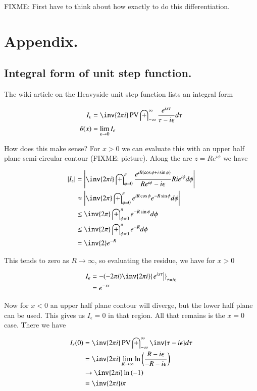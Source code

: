 \documentclass{article}
\DeclareMathOperator{\PV}{PV}
\newcommand{\IIinf}[0]{ \int_{-\infty}^\infty }
\begin{document}
FIXME: First have to think about how exactly to do this differentiation.

\section{ Appendix. }
\subsection{ Integral form of unit step function. }

The wiki article on the Heavyside unit step function lists an integral form

\begin{align}
I_\epsilon &= \inv{2\pi i} \PV \IIinf \frac{e^{ix\tau}}{\tau - i\epsilon} d\tau \\
\theta(x) &= \lim_{\epsilon \rightarrow 0} I_\epsilon
\end{align}

How does this make sense?  For $x>0$ we can evaluate this with an upper half plane semi-circular contour (FIXME: picture).  Along the arc $z = R e^{i\phi}$ we have

\begin{align*}
\Abs{I_\epsilon}
&= \Abs{\inv{2\pi i} \int_{\phi=0}^{\pi} \frac{e^{i R (\cos\phi + i \sin\phi)}}{ R e^{i\phi} - i \epsilon} R i e^{i\phi} d\phi} \\
&\approx \Abs{\inv{2\pi} \int_{\phi=0}^{\pi} e^{i R \cos\phi } e^{- R \sin\phi } d\phi} \\
&\le \inv{2\pi} \int_{\phi=0}^{\pi} e^{- R \sin\phi } d\phi \\
&\le \inv{2\pi} \int_{\phi=0}^{\pi} e^{- R } d\phi \\
&= \inv{2} e^{- R } \\
\end{align*}

This tends to zero as $R \rightarrow \infty$, so evaluating the residue, we have for $x > 0$

\begin{align*}
{I_\epsilon}
&= -(-2 \pi i) \inv{2\pi i} {\left. {e^{ix\tau}} \right\vert}_{\tau = i\epsilon} \\
&= e^{-x\epsilon}
\end{align*}

Now for $x<0$ an upper half plane contour will diverge, but the lower half plane can be used.  This gives us $I_\epsilon = 0$ in that region.
All that remains is the $x=0$ case.  There we have

\begin{align*}
I_\epsilon(0)
&= \inv{2\pi i} \PV \IIinf \inv{\tau - i\epsilon} d\tau \\
&= \inv{2\pi i} \lim_{R \rightarrow \infty} \ln\left( \frac{R - i\epsilon} {-R - i\epsilon} \right) \\
& \rightarrow \inv{2\pi i} \ln\left( -1 \right) \\
&= \inv{2\pi i} i \pi \\
\end{align*}
\end{document}
